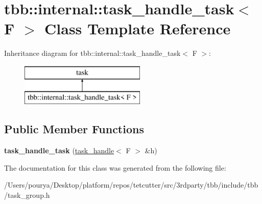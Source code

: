 \hypertarget{classtbb_1_1internal_1_1task__handle__task}{}\section{tbb\+:\+:internal\+:\+:task\+\_\+handle\+\_\+task$<$ F $>$ Class Template Reference}
\label{classtbb_1_1internal_1_1task__handle__task}
Inheritance diagram for tbb\+:\+:internal\+:\+:task\+\_\+handle\+\_\+task$<$ F $>$\+:\begin{figure}[H]
\begin{center}
\leavevmode
\includegraphics[height=2.000000cm]{classtbb_1_1internal_1_1task__handle__task}
\end{center}
\end{figure}
\subsection*{Public Member Functions}
\begin{DoxyCompactItemize}
\item 
\hypertarget{classtbb_1_1internal_1_1task__handle__task_abcddb511967aa06d264ac6c06c4fb08b}{}{\bfseries task\+\_\+handle\+\_\+task} (\hyperlink{classtbb_1_1task__handle}{task\+\_\+handle}$<$ F $>$ \&h)\label{classtbb_1_1internal_1_1task__handle__task_abcddb511967aa06d264ac6c06c4fb08b}

\end{DoxyCompactItemize}


The documentation for this class was generated from the following file\+:\begin{DoxyCompactItemize}
\item 
/\+Users/pourya/\+Desktop/platform/repos/tetcutter/src/3rdparty/tbb/include/tbb/task\+\_\+group.\+h\end{DoxyCompactItemize}
